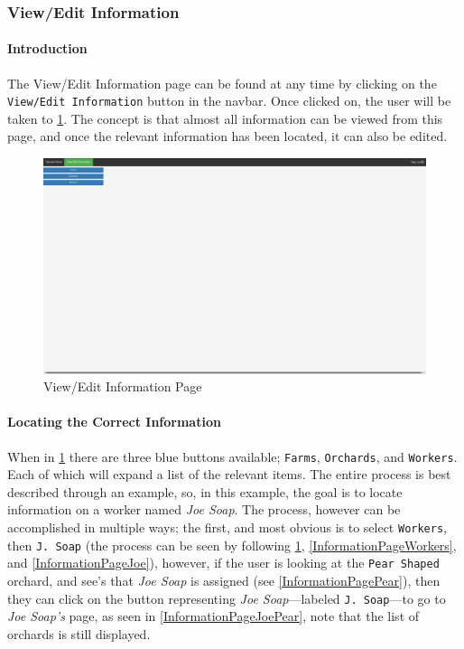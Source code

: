 \documentclass[11pt]{article}
\begin{document}
\subsubsection{View/Edit Information}
\label{webInformation}
\paragraph{Introduction}The View/Edit Information page can be found at any time by clicking on the \texttt{View/Edit Information} button in the navbar. Once clicked on, the user will be taken to \ref{InformationPage}. The concept is that almost all information can be viewed from this page, and once the relevant information has been located, it can also be edited.

\begin{figure}
 \centering
 \includegraphics[width=12cm, keepaspectratio]{Images/webInformation-Page.png}
 \caption{View/Edit Information Page}
 \label{InformationPage}
\end{figure}

\paragraph{Locating the Correct Information}When in \ref{InformationPage} there are three blue buttons available; \texttt{Farms}, \texttt{Orchards}, and \texttt{Workers}. Each of which will expand a list of the relevant items. The entire process is best described through an example, so, in this example, the goal is to locate information on a worker named \textit{Joe Soap}. The process, however can be accomplished in multiple ways; the first, and most obvious is to select \texttt{Workers}, then \texttt{J. Soap} (the process can be seen by following \ref{InformationPage}, \ref{InformationPageWorkers}, and \ref{InformationPageJoe}), however, if the user is looking at the \texttt{Pear Shaped} orchard, and see's that \textit{Joe Soap} is assigned (see \ref{InformationPagePear}), then they can click on the button representing \textit{Joe Soap}---labeled \texttt{J. Soap}---to go to \textit{Joe Soap's} page, as seen in \ref{InformationPageJoePear}, note that the list of orchards is still displayed.
\end{document}
